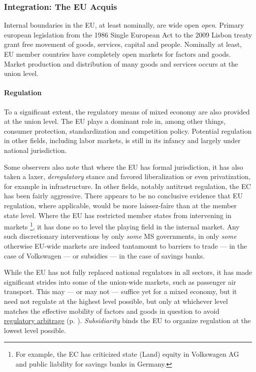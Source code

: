\documentclass[11pt,a4paper,oneside,openright]{article}
\begin{document}
\subsubsection[Integration]{Integration: The EU Acquis} \label{sec:EU-Acquis}
Internal boundaries in the \gls{EU}, at least nominally, are wide open \emph{open}. %
Primary european legislation from the 1986 Single European Act to the 2009 Lisbon treaty grant free movement of goods, services, capital and people. 
Nominally at least, \gls{EU} member countries have completely open markets for factors and goods. 
Market production and distribution of many goods and services occurs at the union level.

\paragraph{Regulation} To a significant extent, the regulatory means of mixed economy are also provided at the union level. 
The \gls{EU} plays a dominant role in, among other things, consumer protection, standardization and competition policy. 
Potential regulation in other fields, including labor markets, is still in its infancy and largely under national jurisdiction. %

Some observers also note that where the \gls{EU} has formal jurisdiction, it has also taken a laxer, \emph{deregulatory} stance and favored liberalization or even privatization, for example in infrastructure. %
In other fields, notably antitrust regulation, the \gls{EC} has been fairly aggressive. 
There appears to be no conclusive evidence that \gls{EU} regulation, where applicable, would be more laissez-faire than at the member state level. %
Where the \gls{EU} has restricted member states from intervening in markets
	\footnote{
		For example, the \gls{EC} has criticized state (Land) equity in Volkswagen AG and public liability for savings banks in Germany.
	}, 
it has done so to level the playing field in the internal market. 
Any such discretionary interventions by only \emph{some} \gls{MS} governments, in only \emph{some} otherwise \gls{EU}-wide markets are indeed tantamount to barriers to trade --- in the case of Volkswagen --- or subsidies --- in the case of savings banks.  %

While the \gls{EU} has not fully replaced national regulators in all sectors, it has made significant strides into some of the union-wide markets, such as passenger air transport. 
This may --- or may not --- suffice yet for a mixed economy, but it need not regulate at the highest level possible, but only at whichever level matches the effective mobility of factors and goods in question to avoid \hyperref[sec:regulatory]{regulatory arbitrage} (p. \pageref{sec:regulatory}). 
\emph{Subsidiarity} binds the \gls{EU} to organize regulation at the lowest level possible.
\end{document}
